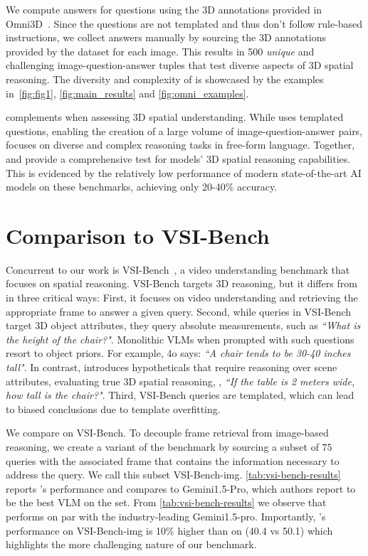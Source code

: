 We compute answers for questions using the 3D annotations provided in Omni3D~\cite{omni3d}.
Since the questions are not templated and thus don't follow rule-based instructions, we collect answers manually by sourcing the 3D annotations provided by the dataset for each image.
This results in 500 \emph{unique} and challenging image-question-answer tuples that test diverse aspects of 3D spatial reasoning. 
The diversity and complexity of \ourbench is showcased by the examples in~\cref{fig:fig1}, \cref{fig:main_results} and \cref{fig:omni_examples}.

\ourbench complements \clevr when assessing 3D spatial understanding. While \clevr uses templated questions, enabling the creation of a large volume of image-question-answer pairs, \ourbench focuses on diverse and complex reasoning tasks in free-form language. 
Together, \clevr and \ourbench provide a comprehensive test for models' 3D spatial reasoning capabilities. This is evidenced by the relatively low performance of modern state-of-the-art AI models on these benchmarks, achieving only 20-40\% accuracy.

\section{Comparison to VSI-Bench}
\label{sec:vsi-bench}


Concurrent to our work is VSI-Bench~\cite{thinkinginspace}, a video understanding benchmark that focuses on spatial reasoning. 
VSI-Bench targets 3D reasoning, but it differs from \ourbench in three critical ways:
First, it focuses on video understanding and retrieving the appropriate frame to answer a given query.
Second, while queries in VSI-Bench target 3D object attributes, they query absolute measurements, such as \emph{``What is the height of the chair?"}.
Monolithic VLMs when prompted with such questions resort to object priors. For example, \gpt4o says: \emph{``A chair tends to be 30-40 inches tall"}. 
In contrast, \ourbench introduces hypotheticals that require reasoning over scene attributes, evaluating true 3D spatial reasoning, \eg, \emph{``If the table is 2 meters wide, how tall is the chair?"}.
Third, VSI-Bench queries are templated, which can lead to biased conclusions due to template overfitting.

We compare \method on VSI-Bench. To decouple frame retrieval from image-based reasoning, we create a variant of the benchmark by sourcing a subset of $75$ queries with the associated frame that contains the information necessary to address the query.
We call this subset VSI-Bench-img. 
\cref{tab:vsi-bench-results} reports \method's performance and compares to Gemini1.5-Pro, which authors report to be the best VLM on the set.
From \cref{tab:vsi-bench-results} we observe that \method performs on par with the industry-leading Gemini1.5-pro. 
Importantly, \method's performance on VSI-Bench-img is 10\% higher than on \ourbench (40.4 vs 50.1) which highlights the more challenging nature of our benchmark.

